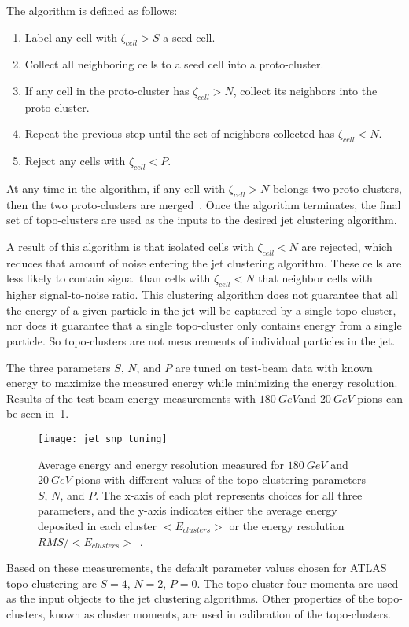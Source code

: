The algorithm is defined as follows:
\begin{enumerate}
    \item Label any cell with $\zeta_{cell}>S$ a seed cell.
    \item Collect all neighboring cells to a seed cell into a proto-cluster.
    \item If any cell in the proto-cluster has $\zeta_{cell}>N$, collect its neighbors into the proto-cluster.
    \item Repeat the previous step until the set of neighbors collected has $\zeta_{cell}<N$.
    \item Reject any cells with $\zeta_{cell}<P$.
\end{enumerate}
At any time in the algorithm, if any cell with $\zeta_{cell}>N$ belongs two proto-clusters, then the two proto-clusters are merged~\cite{jet-topo-cluster}.
Once the algorithm terminates, the final set of topo-clusters are used as the inputs to the desired jet clustering algorithm.

A result of this algorithm is that isolated cells with $\zeta_{cell} < N$ are rejected, which reduces that amount of noise entering the jet clustering algorithm.
These cells are less likely to contain signal than cells with $\zeta_{cell}<N$ that neighbor cells with higher signal-to-noise ratio.
This clustering algorithm does not guarantee that all the energy of a given particle in the jet will be captured by a single topo-cluster, nor does it guarantee that a single topo-cluster only contains energy from a single particle.
So topo-clusters are not measurements of individual particles in the jet.

The three parameters $S$, $N$, and $P$ are tuned on test-beam data with known energy to maximize the measured energy while minimizing the energy resolution\cite{energy-measurement-of-hadrons}.
Results of the test beam energy measurements with $180~GeV$and $20~GeV$ pions can be seen in~\ref{fig:jet_snp_tuning}.
\begin{figure}[!ht]
    \centering
\texttt{[image: jet\_snp\_tuning]}
\caption{Average energy and energy resolution measured for $180~GeV$ and $20~GeV$ pions with different values of the
topo-clustering parameters $S$, $N$, and $P$.
The x-axis of each plot represents choices for all three parameters, and the y-axis indicates either the average
energy deposited in each cluster $<E_{clusters}>$ or the energy resolution $RMS/<E_{clusters}>$~\cite{energy-measurement-of-hadrons}.}
\label{fig:jet_snp_tuning}
\end{figure}
Based on these measurements, the default parameter values chosen for ATLAS topo-clustering are $S=4$, $N=2$, $P=0$.
The topo-cluster four momenta are used as the input objects to the jet clustering algorithms.
Other properties of the topo-clusters, known as cluster moments, are used in calibration of the topo-clusters.

